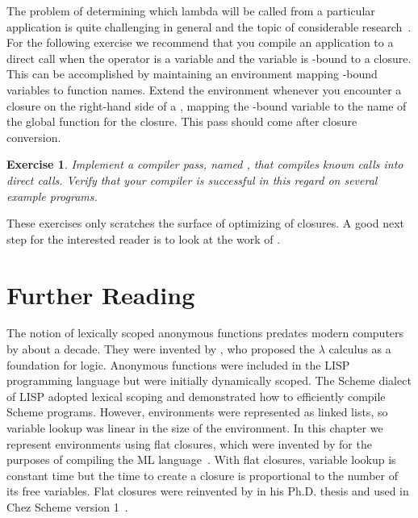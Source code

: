 \documentclass[7x10]{TimesAPriori_MIT}%
\newtheorem{exercise}[theorem]{Exercise}
\begin{document}
The problem of determining which lambda will be called from a
particular application is quite challenging in general and the topic
of considerable research~\citep{Shivers:1988aa,Gilray:2016aa}. For the
following exercise we recommend that you compile an application to a
direct call when the operator is a variable and the variable is
-bound to a closure. This can be accomplished by maintaining
an environment mapping -bound variables to function names.
Extend the environment whenever you encounter a closure on the
right-hand side of a , mapping the -bound variable
to the name of the global function for the closure.  This pass should
come after closure conversion.

\begin{exercise}\normalfont
Implement a compiler pass, named , that
compiles known calls into direct calls. Verify that your compiler is
successful in this regard on several example programs.
\end{exercise}

These exercises only scratches the surface of optimizing of
closures. A good next step for the interested reader is to look at the
work of \citet{Keep:2012ab}.

\section{Further Reading}

The notion of lexically scoped anonymous functions predates modern
computers by about a decade. They were invented by
\citet{Church:1932aa}, who proposed the $\lambda$ calculus as a
foundation for logic. Anonymous functions were included in the
LISP~\citep{McCarthy:1960dz} programming language but were initially
dynamically scoped. The Scheme dialect of LISP adopted lexical scoping
and \citet{Guy-L.-Steele:1978yq} demonstrated how to efficiently
compile Scheme programs. However, environments were represented as
linked lists, so variable lookup was linear in the size of the
environment. In this chapter we represent environments using flat
closures, which were invented by
\citet{Cardelli:1983aa,Cardelli:1984aa} for the purposes of compiling
the ML language~\citep{Gordon:1978aa,Milner:1990fk}. With flat
closures, variable lookup is constant time but the time to create a
closure is proportional to the number of its free variables.  Flat
closures were reinvented by \citet{Dybvig:1987ab} in his Ph.D. thesis
and used in Chez Scheme version 1~\citep{Dybvig:2006aa}.
\end{document}
